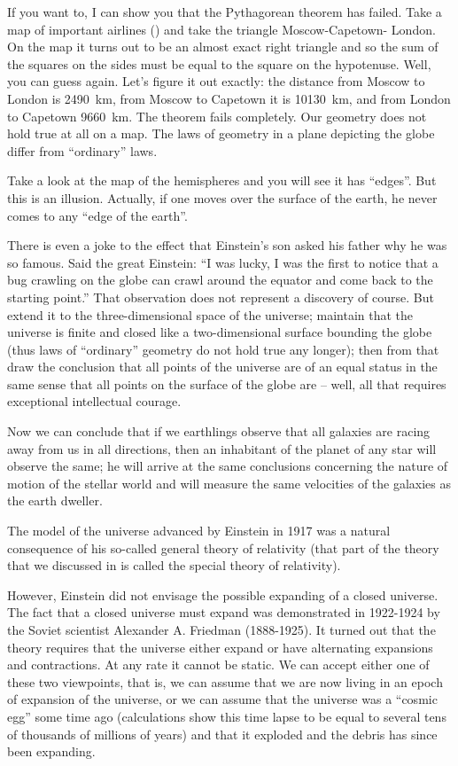 If you want to, I can show you that the Pythagorean theorem has failed. Take a map of important airlines () and take the triangle Moscow-Capetown- London. On the map it turns out to be an almost exact right triangle and so the sum of the squares on the sides must be equal to the square on the hypotenuse. Well, you can guess again. Let’s figure it out exactly: the distance from Moscow to London is \SI{2490}{\kilo\meter}, from Mos­cow to Capetown it is \SI{10130}{\kilo\meter}, and from London to Capetown \SI{9660}{\kilo\meter}. The theorem fails completely. Our geometry does not hold true at all on a map. The laws of geometry in a plane depicting the globe differ from ``or­dinary'' laws.

Take a look at the map of the hemispheres and you will see it has ``edges''. But this is an illusion. Actually, if one moves over the surface of the earth, he never comes to any ``edge of the earth''.

There is even a joke to the effect that Einstein’s son asked his father why he was so famous. Said the great Einstein: ``I was lucky, I was the first to notice that a bug crawling on the globe can crawl around the equator and come back to the starting point.'' That observation does not represent a discovery of course. But extend it to the three-dimensional space of the universe; maintain that the universe is finite and closed like a two-dimen­sional surface bounding the globe (thus laws of ``ordinary'' geometry do not hold true any longer); then from that draw the conclusion that all points of the universe are of an equal status in the same sense that all points on the surface of the globe are -- well, all that requires ex­ceptional intellectual courage.

Now we can conclude that if we earthlings observe that all galaxies are racing away from us in all directions, then an inhabitant of the planet of any star will observe the same; he will arrive at the same conclusions concerning the nature of motion of the stellar world and will measure the same velocities of the galaxies as the earth dweller.

The model of the universe advanced by Einstein in 1917 was a natural consequence of his so-called general theory of relativity (that part of the theory that we discussed in  is called the special theory of relativity).

However, Einstein did not envisage the possible expanding of a closed universe. The fact that a closed universe must expand was demonstrated in 1922-1924 by the Soviet scientist Alexander A. Friedman (1888-1925). It turned out that the theory requires that the universe either ex­pand or have alternating expansions and contractions. At any rate it cannot be static. We can accept either one of these two viewpoints, that is, we can assume that we are now living in an epoch of expansion of the universe, or we can assume that the universe was a ``cosmic egg'' some time ago (calculations show this time lapse to be equal to several tens of thousands of millions of years) and that it exploded and the debris has since been ex­panding.

